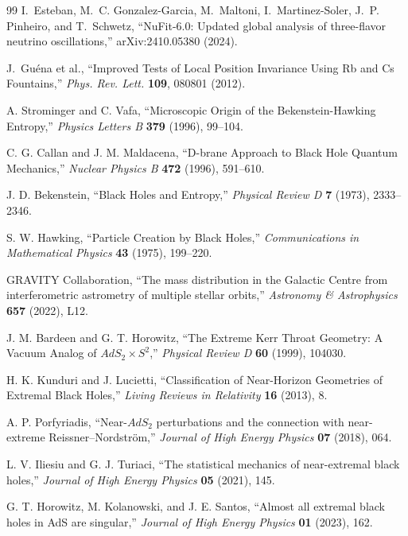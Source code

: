 \documentclass[11pt,a4paper]{article}
\begin{document}
\begin{thebibliography}{99}
I.~Esteban, M.~C. Gonzalez-Garcia, M.~Maltoni, I.~Martinez-Soler,
J.~P. Pinheiro, and T.~Schwetz,
``NuFit-6.0: Updated global analysis of three-flavor neutrino oscillations,''
arXiv:2410.05380 (2024).

J.~Guéna et al., ``Improved Tests of Local Position Invariance Using
Rb and Cs Fountains,'' \textit{Phys. Rev. Lett.} \textbf{109}, 080801
(2012).

A. Strominger and C. Vafa,
``Microscopic Origin of the Bekenstein-Hawking Entropy,''
{\em Physics Letters B} {\bf 379} (1996), 99--104.

C. G. Callan and J. M. Maldacena,
``D-brane Approach to Black Hole Quantum Mechanics,''
{\em Nuclear Physics B} {\bf 472} (1996), 591--610.

J. D. Bekenstein,
``Black Holes and Entropy,''
{\em Physical Review D} {\bf 7} (1973), 2333--2346.

S. W. Hawking,
``Particle Creation by Black Holes,''
{\em Communications in Mathematical Physics} {\bf 43} (1975), 199--220.

GRAVITY Collaboration,
``The mass distribution in the Galactic Centre from interferometric astrometry of multiple stellar orbits,''
{\em Astronomy \& Astrophysics} {\bf 657} (2022), L12.

J. M. Bardeen and G. T. Horowitz,
``The Extreme Kerr Throat Geometry: A Vacuum Analog of \(AdS_2\times S^2\),''
{\em Physical Review D} {\bf 60} (1999), 104030.

H. K. Kunduri and J. Lucietti,
``Classification of Near-Horizon Geometries of Extremal Black Holes,''
{\em Living Reviews in Relativity} {\bf 16} (2013), 8.

A. P. Porfyriadis,
``Near-\(AdS_2\) perturbations and the connection with near-extreme Reissner--Nordstr\"om,''
{\em Journal of High Energy Physics} {\bf 07} (2018), 064.

L. V. Iliesiu and G. J. Turiaci,
``The statistical mechanics of near-extremal black holes,''
{\em Journal of High Energy Physics} {\bf 05} (2021), 145.

G. T. Horowitz, M. Kolanowski, and J. E. Santos,
``Almost all extremal black holes in AdS are singular,''
{\em Journal of High Energy Physics} {\bf 01} (2023), 162.


\end{thebibliography}
\end{document}
